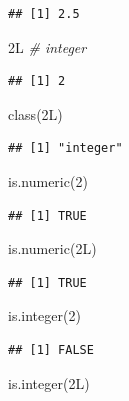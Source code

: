 \documentclass[
]{book}
\newenvironment{Shaded}{\begin{snugshade}}{\end{snugshade}}
\newcommand{\CommentTok}[1]{\textcolor[rgb]{0.56,0.35,0.01}{\textit{#1}}}
\newcommand{\DecValTok}[1]{\textcolor[rgb]{0.00,0.00,0.81}{#1}}
\newcommand{\FunctionTok}[1]{\textcolor[rgb]{0.00,0.00,0.00}{#1}}
\newcommand{\NormalTok}[1]{#1}
\begin{document}
\begin{verbatim}
## [1] 2.5
\end{verbatim}

\begin{Shaded}
\begin{Highlighting}[]
\NormalTok{2L  }\CommentTok{\# integer}
\end{Highlighting}
\end{Shaded}

\begin{verbatim}
## [1] 2
\end{verbatim}

\begin{Shaded}
\begin{Highlighting}[]
\FunctionTok{class}\NormalTok{(2L)}
\end{Highlighting}
\end{Shaded}

\begin{verbatim}
## [1] "integer"
\end{verbatim}

\begin{Shaded}
\begin{Highlighting}[]
\FunctionTok{is.numeric}\NormalTok{(}\DecValTok{2}\NormalTok{)}
\end{Highlighting}
\end{Shaded}

\begin{verbatim}
## [1] TRUE
\end{verbatim}

\begin{Shaded}
\begin{Highlighting}[]
\FunctionTok{is.numeric}\NormalTok{(2L)}
\end{Highlighting}
\end{Shaded}

\begin{verbatim}
## [1] TRUE
\end{verbatim}

\begin{Shaded}
\begin{Highlighting}[]
\FunctionTok{is.integer}\NormalTok{(}\DecValTok{2}\NormalTok{)}
\end{Highlighting}
\end{Shaded}

\begin{verbatim}
## [1] FALSE
\end{verbatim}

\begin{Shaded}
\begin{Highlighting}[]
\FunctionTok{is.integer}\NormalTok{(2L)}
\end{Highlighting}
\end{Shaded}
\end{document}

